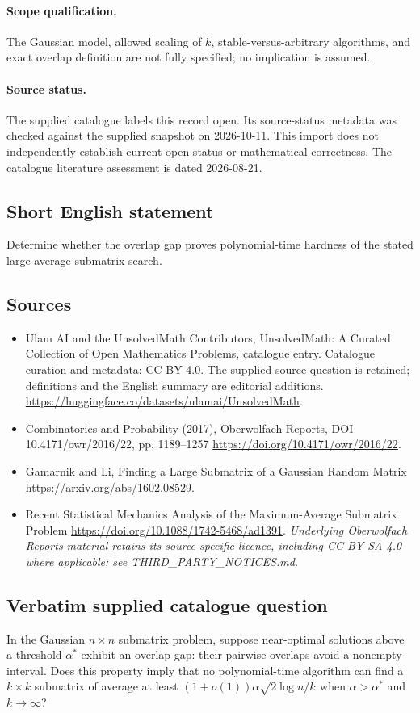 \documentclass[11pt]{article}
\begin{document}
\paragraph{Scope qualification.}
The Gaussian model, allowed scaling of $k$, stable-versus-arbitrary algorithms, and exact overlap definition are not fully specified; no implication is assumed.
\paragraph{Source status.}
The supplied catalogue labels this record open. Its source-status metadata was checked against the supplied snapshot on 2026-10-11. This import does not independently establish current open status or mathematical correctness. The catalogue literature assessment is dated 2026-08-21.
\subsection{Short English statement}
Determine whether the overlap gap proves polynomial-time hardness of the stated large-average submatrix search.
\subsection{Sources}
\begin{itemize}
\item[S1] Ulam AI and the UnsolvedMath Contributors, UnsolvedMath: A Curated Collection of Open Mathematics Problems, catalogue entry. Catalogue curation and metadata: CC BY 4.0. The supplied source question is retained; definitions and the English summary are editorial additions.
\url{https://huggingface.co/datasets/ulamai/UnsolvedMath}.
\item[S2] Combinatorics and Probability (2017), Oberwolfach Reports, DOI 10.4171/owr/2016/22, pp. 1189--1257
\url{https://doi.org/10.4171/owr/2016/22}.
\item[S3] Gamarnik and Li, Finding a Large Submatrix of a Gaussian Random Matrix
\url{https://arxiv.org/abs/1602.08529}.
\item[S4] Recent Statistical Mechanics Analysis of the Maximum-Average Submatrix Problem
\url{https://doi.org/10.1088/1742-5468/ad1391}.
\textit{Underlying Oberwolfach Reports material retains its source-specific licence, including CC BY-SA 4.0 where applicable; see THIRD\_PARTY\_NOTICES.md.}
\end{itemize}
\subsection{Verbatim supplied catalogue question}
In the Gaussian $n\times n$ submatrix problem, suppose near-optimal solutions above a threshold $\alpha^*$ exhibit an overlap gap: their pairwise overlaps avoid a nonempty interval. Does this property imply that no polynomial-time algorithm can find a $k\times k$ submatrix of average at least $(1+o(1))\alpha\sqrt{2\log n/k}$ when $\alpha>\alpha^*$ and $k\to\infty$?
\end{document}
